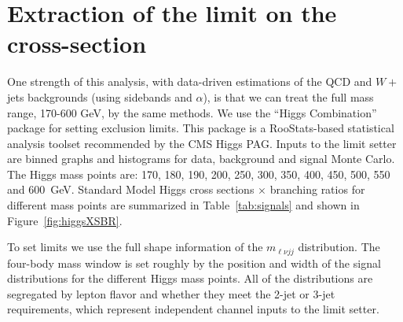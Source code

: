 \section{Extraction of the limit on the cross-section}
\label{sec:limitExtraction}

One strength of this analysis, with data-driven estimations of the QCD
and $W+$jets backgrounds (using sidebands and $\alpha$), is that we
can treat the full mass range, 170-600 GeV, by the same methods.  We
use the ``Higgs Combination'' package \cite{cite:combine} for setting
exclusion limits. This package is a RooStats\cite{cite:roostats}-based
statistical analysis toolset recommended by the CMS Higgs PAG.  Inputs
to the limit setter are binned graphs and histograms for data,
background and signal Monte Carlo.  The Higgs mass points are: 170,
180, 190, 200, 250, 300, 350, 400, 450, 500, 550 and 600~GeV. Standard
Model Higgs cross sections $\times$ branching ratios for different
mass points are summarized in Table~\ref{tab:signals} and shown in
Figure~\ref{fig:higgsXSBR}.


To set limits we use the full shape information of the $m_{\ell\nu
jj}$ distribution.  The four-body mass window is set roughly by the
position and width of the signal distributions for the different Higgs
mass points. All of the distributions are segregated by lepton flavor
and whether they meet the 2-jet or 3-jet requirements, which represent
independent channel inputs to the limit setter.

